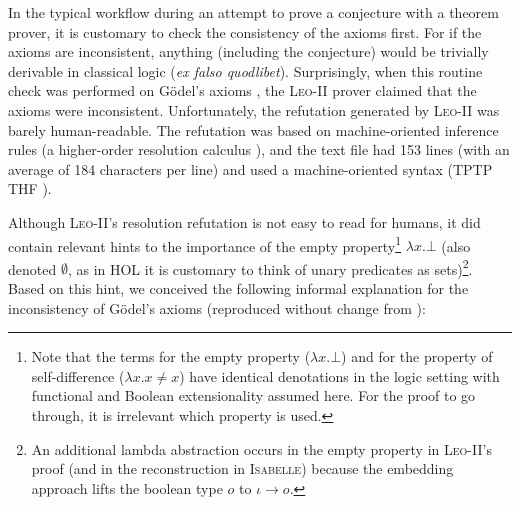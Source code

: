 \documentclass{llncs}
\newcommand{\imp}{{\rightarrow}}
\begin{document}
In the typical workflow during an attempt to prove a conjecture with a
theorem prover, it is customary to check the consistency of the axioms
first. For if the axioms are inconsistent, anything (including the
conjecture) would be trivially derivable in classical logic (\emph{ex
  falso quodlibet}). Surprisingly, when this routine check was
performed on G\"odel's axioms \cite{C40}, the \textsc{Leo-II} prover
claimed that the axioms were inconsistent. Unfortunately, the
refutation generated by \textsc{Leo-II} was barely human-readable. The
refutation was based on machine-oriented inference rules (a higher-order resolution calculus \cite{J30}), and the
text file had 153 lines (with an average of 184
  characters per line) and used a machine-oriented syntax (TPTP THF
\cite{J22}). 


Although \textsc{Leo-II}'s resolution refutation is not easy to read
for humans, it did contain relevant hints to the importance of the
empty property\footnote{
  Note that the terms for the empty property ($\lambda x. \bot$) and for the property of self-difference ($\lambda x.  x\not=x$) have identical denotations in the logic setting
  with functional and Boolean extensionality assumed
  here. 
  For the proof to go through, it is
  irrelevant which property is used.
} $\lambda x. \bot$ (also denoted $\emptyset$, as in HOL it is customary to think of unary predicates as sets)\footnote{An additional lambda abstraction occurs in the empty property in \textsc{Leo-II}'s proof (and in the reconstruction in \textsc{Isabelle}) because the embedding approach lifts the boolean type $o$ to $\iota \imp o$.}. Based on this hint, we conceived the following informal explanation for the inconsistency of G\"odel's axioms (reproduced without change from \cite{C55}):
%
\end{document}
